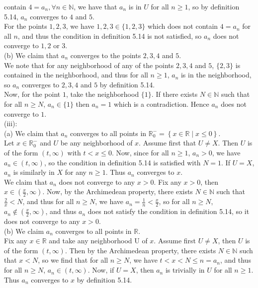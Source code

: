 \documentclass[a4paper]{article}
\begin{document}
       contain $4 = a_n, \forall n \in \mathbb{N}$, we have that $a_n$ is in
       $U$ for all $n\ge 1$, so by definition 5.14, $a_n$ converges to $4$ and
       $5$.\\
       For the points  $1,2,3$, we have $1,2,3 \in \{1,2,3\}$ which does not
       contain  $4=a_n$ for all $n$, and thus the condition in definition 5.14
       is not satisfied, so $a_n$ does not converge to $1,2$ or $3$.\\
       \linebreak
       (b) We claim that $a_n$ converges to the points $2,3,4$ and $5$.\\
       We note that for any neighborhood of any of the points $2,3,4$ and $5$, 
       $\{2,3\}$ is contained in the neighborhood, and thus for all $n\ge 1$,
       $a_n$ is in the neighborhood, so $a_n$ converges to $2,3,4$ and $5$ by
       definition 5.14.\\
       Now, for the point $1$, take the neighborhood $\{1\}$. If there exists
       $N \in \mathbb{N}$ such that for all $n\ge N$, $a_n \in \{1\}$ then
       $a_n = 1$ which is a contradiction. Hence $a_n$ does not converge to
       $1$.\\
       \linebreak
       (iii):\\
       (a) We claim that $a_n$ converges to all points in $\mathbb{R}_{0}^{-}
       = \left\{ x \in \mathbb{R}  \mid x\le 0 \right\} $.\\
       Let $x \in \mathbb{R}_{0}^{-}$ and $U$ be any neighborhood of $x$.
       Assume first that $U \neq X$. Then $U$ is of the form
       $(t,\infty)$ with $t<x \le 0$. Now, since for all $n\ge 1$, $a_n
       > 0$, we have $a_n \in (t,\infty)$, so the condition in definition 5.14
       is satisfied with $N=1$. If $U = X$, $a_n$ is similarly in $X$ for any
       $n\ge 1$. Thus $a_n$ converges to $x$.\\
       We claim that $a_n$ does not converge to any $x >0$. Fix any $x >0$,
       then
       $x \in (\frac{x}{2},\infty)$. Now, by the Archimedean property,
       there exists $N \in \mathbb{N}$ such
       that $\frac{2}{x} < N$, and thus for all $n\ge N$, we have
       $a_n = \frac{1}{n} < \frac{x}{2}$, so for all $n \ge N$, $a_n \not\in 
       (\frac{x}{2},\infty)$, and thus $a_n$ does not satisfy the condition in
       definition 5.14, so it does not converge to any $x >0$.\\
       \linebreak
       (b) We claim $a_n$ converges to all points in $\mathbb{R}$.\\
       Fix any $x \in \mathbb{R}$ and take any neighborhood U of $x$. Assume
       first $U\neq X$, then $U$ is of the form $(t, \infty)$.
       Then by the Archimedean property,
       there exists $N \in \mathbb{N}$ such that $x < N$, so we
       find that for all $n\ge N$, we have
       $t < x < N \le n = a_n$, and thus for all $n\ge N$, $a_n \in
       (t,\infty)$. Now, if $U=X$, then $a_n$ is trivially in $U$ for all $n\ge
       1$.
       Thus $a_n$ converges to $x$ by definition 5.14.
\end{document}

